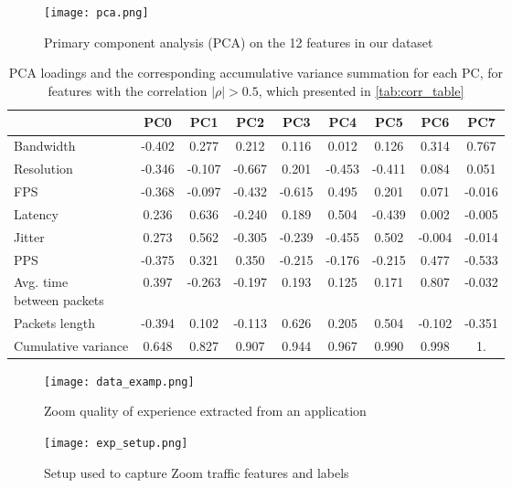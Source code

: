 \begin{figure}
    \centering
    \texttt{[image: pca.png]}
    \caption{Primary component analysis (PCA) on the 12 features in our dataset}
    \label{fig:pca}
\end{figure}

\begin{table*}[]
    \caption{PCA loadings and the corresponding accumulative variance summation for each PC, for features with the correlation $|\rho|>0.5$, which presented in \cref{tab:corr_table}}
    \centering
    \begin{tabular}{l|c|c|c|c|c|c|c|c}
      &   PC0  &  PC1  &  PC2   &  PC3  &  PC4  &  PC5  &  PC6  &  PC7  \\
    \hline
    Bandwidth   & -0.402 & 0.277 & 0.212  & 0.116 & 0.012 & 0.126 & 0.314 & 0.767 \\
    Resolution  & -0.346 & -0.107& -0.667 &	0.201 & -0.453&	-0.411&	0.084 &	0.051 \\
    FPS	        & -0.368 & -0.097& -0.432 & -0.615& 0.495 & 0.201 &	0.071 &-0.016 \\
    Latency     & 0.236	 & 0.636 & -0.240 & 0.189 &	0.504 &	-0.439&	0.002 &-0.005 \\
    Jitter      & 0.273	 & 0.562 & -0.305 & -0.239&	-0.455&	0.502 &	-0.004&-0.014 \\
    PPS         &-0.375  & 0.321 & 0.350  & -0.215& -0.176& -0.215& 0.477 &-0.533 \\
    \makecell[l]{Avg. time\\between packets} & 0.397 & -0.263 & -0.197 & 0.193 & 0.125 & 0.171 & 0.807 & -0.032 \\
    Packets length & -0.394 & 0.102 & -0.113 & 0.626 & 0.205 & 0.504 & -0.102 & -0.351 \\
    \hline
    \hline
    Cumulative variance & 0.648 & 0.827 & 0.907 & 0.944 & 0.967 & 0.990 & 0.998 & 1.\\        

    \end{tabular}

    \label{tab:pca_loadings}
\end{table*}

\begin{figure}
    \centering
    \texttt{[image: data\_examp.png]}
    \caption{Zoom quality of experience extracted from an application}
    \label{fig:qoe-from-app}
\end{figure}

\begin{figure}
    \centering
    \texttt{[image: exp\_setup.png]}
    \caption{Setup used to capture Zoom traffic features and labels}
    \label{fig:exp-setup}
\end{figure}

